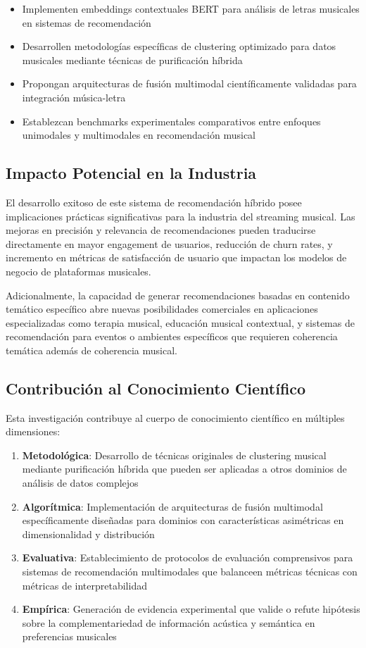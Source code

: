 \documentclass[12pt,a4paper]{article}
\begin{document}
\begin{itemize}
    \item Implementen embeddings contextuales BERT para análisis de letras musicales en sistemas de recomendación
    \item Desarrollen metodologías específicas de clustering optimizado para datos musicales mediante técnicas de purificación híbrida
    \item Propongan arquitecturas de fusión multimodal científicamente validadas para integración música-letra
    \item Establezcan benchmarks experimentales comparativos entre enfoques unimodales y multimodales en recomendación musical
\end{itemize}

\subsection{Impacto Potencial en la Industria}

El desarrollo exitoso de este sistema de recomendación híbrido posee implicaciones prácticas significativas para la industria del streaming musical. Las mejoras en precisión y relevancia de recomendaciones pueden traducirse directamente en mayor engagement de usuarios, reducción de churn rates, y incremento en métricas de satisfacción de usuario que impactan los modelos de negocio de plataformas musicales.

Adicionalmente, la capacidad de generar recomendaciones basadas en contenido temático específico abre nuevas posibilidades comerciales en aplicaciones especializadas como terapia musical, educación musical contextual, y sistemas de recomendación para eventos o ambientes específicos que requieren coherencia temática además de coherencia musical.

\subsection{Contribución al Conocimiento Científico}

Esta investigación contribuye al cuerpo de conocimiento científico en múltiples dimensiones:

\begin{enumerate}
    \item \textbf{Metodológica}: Desarrollo de técnicas originales de clustering musical mediante purificación híbrida que pueden ser aplicadas a otros dominios de análisis de datos complejos
    \item \textbf{Algorítmica}: Implementación de arquitecturas de fusión multimodal específicamente diseñadas para dominios con características asimétricas en dimensionalidad y distribución
    \item \textbf{Evaluativa}: Establecimiento de protocolos de evaluación comprensivos para sistemas de recomendación multimodales que balanceen métricas técnicas con métricas de interpretabilidad
    \item \textbf{Empírica}: Generación de evidencia experimental que valide o refute hipótesis sobre la complementariedad de información acústica y semántica en preferencias musicales
\end{enumerate}
\end{document}
